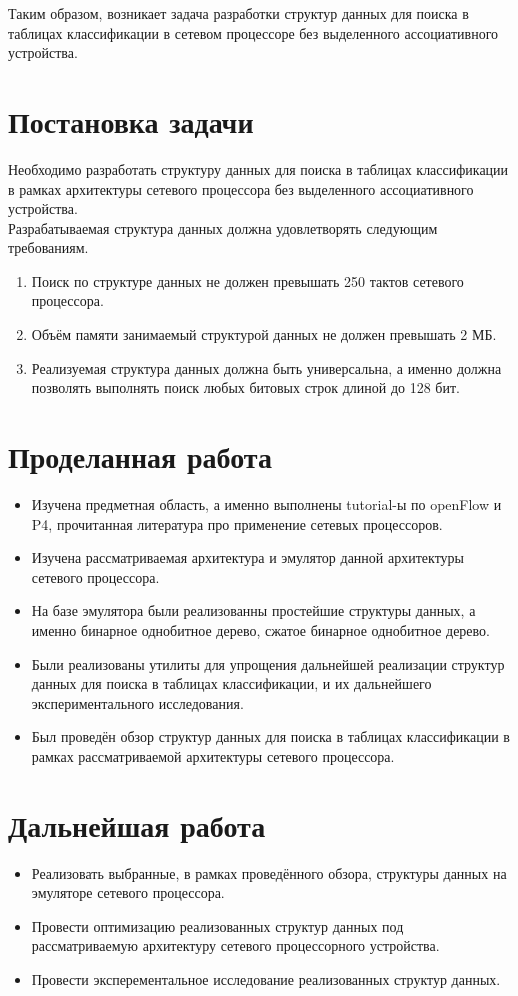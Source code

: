 \documentclass[a4peper, 12pt, titlepage, finall]{extreport}
\begin{document}
        Таким образом, возникает задача разработки структур данных для поиска в таблицах классификации в сетевом процессоре без выделенного ассоциативного устройства.
    \section{Постановка задачи}
        Необходимо разработать структуру данных для поиска в таблицах классификации в рамках архитектуры сетевого процессора без выделенного ассоциативного устройства. 
        \\
        Разрабатываемая структура данных должна удовлетворять следующим требованиям.
        \begin{enumerate}
            \item Поиск по структуре данных не должен превышать 250 тактов сетевого процессора.
            \item Объём памяти занимаемый структурой данных не должен превышать 2 МБ.
            \item Реализуемая структура данных должна быть универсальна, а именно должна позволять выполнять поиск любых битовых строк длиной до 128 бит.
        \end{enumerate}
    \section{Проделанная работа}
        \begin{itemize}
            \item Изучена предметная область, а именно выполнены tutorial-ы по openFlow и P4, прочитанная литература про применение сетевых процессоров.
            \item Изучена рассматриваемая архитектура и эмулятор данной архитектуры сетевого процессора.
            \item На базе эмулятора были реализованны простейшие структуры данных, а именно бинарное однобитное дерево, сжатое бинарное однобитное дерево.
            \item Были реализованы утилиты для упрощения дальнейшей реализации структур данных для поиска в таблицах классификации, и их дальнейшего экспериментального исследования.
            \item Был проведён обзор структур данных для поиска в таблицах классификации в рамках рассматриваемой архитектуры сетевого процессора.
        \end{itemize}
    \section{Дальнейшая работа}
        \begin{itemize}
            \item Реализовать выбранные, в рамках проведённого обзора, структуры данных на эмуляторе сетевого процессора.
            \item Провести оптимизацию реализованных структур данных под рассматриваемую архитектуру сетевого процессорного устройства.
            \item Провести эксперементальное исследование реализованных структур данных.
        \end{itemize}
        \begingroup
        \let\clearpage\relax
        \printbibliography
        \endgroup
\end{document}
